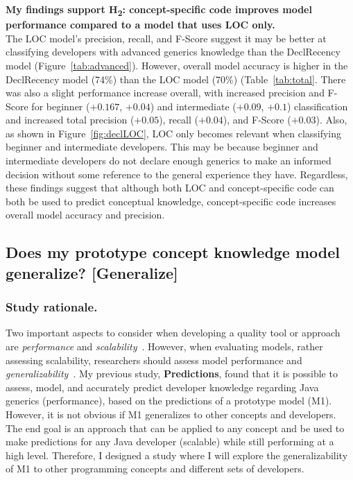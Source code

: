 \documentclass{llncs}
\begin{document}
\noindent\textbf{My findings support H\textsubscript{2}: concept-specific code improves model performance compared to a model that uses LOC only.}\\
The LOC model's precision, recall, and F-Score suggest it may be better at classifying developers with advanced generics knowledge than the DeclRecency model (Figure~\ref{tab:advanced}). However, overall model accuracy is higher in the DeclRecency model (74\%) than the LOC model (70\%) (Table~\ref{tab:total}. There was also a slight performance increase overall, with increased precision and F-Score for beginner (\(+ 0.167\), \(+ 0.04\)) and intermediate (\(+ 0.09\), \(+ 0.1\)) classification and increased total precision (\(+ 0.05\)), recall (\(+ 0.04\)), and F-Score (\(+ 0.03\)). Also, as shown in Figure~\ref{fig:declLOC}, LOC only becomes relevant when classifying beginner and intermediate developers. This may be because beginner and intermediate developers do not declare enough generics to make an informed decision without some reference to the general experience they have.
Regardless, these findings suggest that although both LOC and concept-specific code can both be used to predict conceptual knowledge, concept-specific code increases overall model accuracy and precision.


\subsection{Does my prototype concept knowledge model generalize? [Generalize]} \label{subsec:s4}

\subsubsection{Study rationale.} Two important aspects to consider when developing a quality tool or approach are \emph{performance} and \emph{scalability}~\cite{fox2011performance}. 
However, when evaluating models, rather assessing scalability, researchers should assess model performance and \textit{generalizability}~\cite{forster2000key}. 
My previous study, \textbf{Predictions}, found that it is possible to assess, model, and accurately predict developer knowledge regarding Java generics (performance), based on the predictions of a prototype model (M1). However, it is not obvious if M1 generalizes to other concepts and developers.
The end goal is an approach that can be applied to any concept and be used to make predictions for any Java developer (scalable) while still performing at a high level. Therefore, I designed a study where I will explore the generalizability of M1 to other programming concepts and different sets of developers. 
\end{document}
